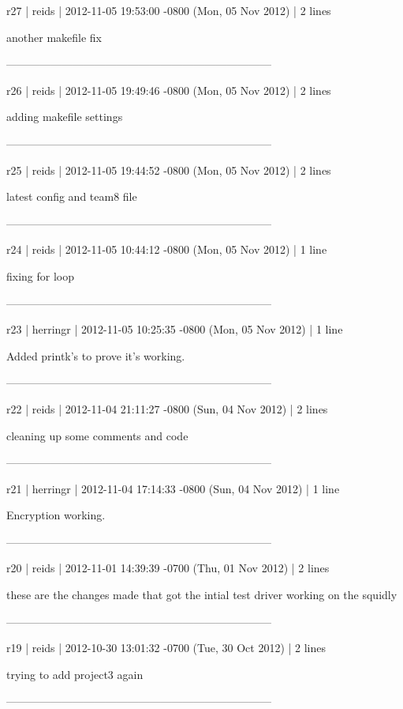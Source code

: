 \documentclass[letterpaper,10pt]{article}
\begin{document}
r27 | reids | 2012-11-05 19:53:00 -0800 (Mon, 05 Nov 2012) | 2 lines


another makefile fix


------------------------------------------------------------------------


r26 | reids | 2012-11-05 19:49:46 -0800 (Mon, 05 Nov 2012) | 2 lines


adding makefile settings


------------------------------------------------------------------------


r25 | reids | 2012-11-05 19:44:52 -0800 (Mon, 05 Nov 2012) | 2 lines


latest config and team8 file


------------------------------------------------------------------------


r24 | reids | 2012-11-05 10:44:12 -0800 (Mon, 05 Nov 2012) | 1 line


fixing for loop


------------------------------------------------------------------------


r23 | herringr | 2012-11-05 10:25:35 -0800 (Mon, 05 Nov 2012) | 1 line


Added printk's to prove it's working.


------------------------------------------------------------------------


r22 | reids | 2012-11-04 21:11:27 -0800 (Sun, 04 Nov 2012) | 2 lines


cleaning up some comments and code


------------------------------------------------------------------------


r21 | herringr | 2012-11-04 17:14:33 -0800 (Sun, 04 Nov 2012) | 1 line


Encryption working.

------------------------------------------------------------------------

r20 | reids | 2012-11-01 14:39:39 -0700 (Thu, 01 Nov 2012) | 2 lines


these are the changes made that got the intial test driver working on the squidly


------------------------------------------------------------------------

r19 | reids | 2012-10-30 13:01:32 -0700 (Tue, 30 Oct 2012) | 2 lines


trying to add project3 again


------------------------------------------------------------------------

%
\end{document}
